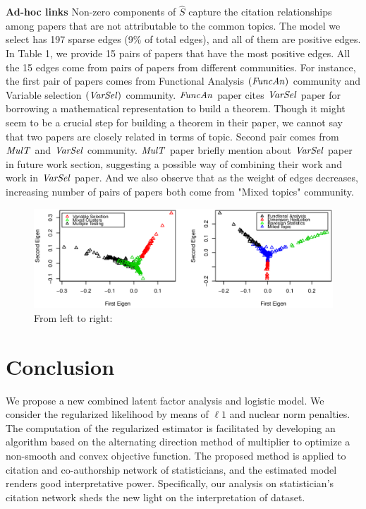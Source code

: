 \documentclass{article}
\begin{document}
\noindent\textbf{Ad-hoc links} Non-zero components of $\hat{S}$ capture the citation relationships among papers that are not attributable to the common topics. The model we select has 197 sparse edges (9\% of total edges), and all of them are positive edges. In Table 1, we provide 15 pairs of papers that have the most positive edges. All the 15 edges come from pairs of papers from different communities. For instance, the first pair of papers comes from Functional Analysis $(\it FuncAn)$ community and Variable selection $(\it VarSel)$ community. $\it FuncAn$ paper cites $\it VarSel$ paper for borrowing a mathematical representation to build a theorem. Though it might seem to be a crucial step for building a theorem in their paper, we cannot say that two papers are closely related in terms of topic. Second pair comes from $\it MulT$  and $\it VarSel$ community. $\it MulT$ paper briefly mention about $\it VarSel$ paper in future work section, suggesting a possible way of combining their work and work in $\it VarSel$ paper.  And we also observe that as the weight of edges decreases, increasing number of pairs of papers both come from "Mixed topics" community. \\

\begin{figure}[!t]
\includegraphics[width=1\textwidth]{Fig3.eps}
\caption{ From left to right: }
\label{fig:figure1}
\end{figure}


\section{Conclusion} 
We propose a new combined latent factor analysis and logistic model. We consider the regularized likelihood by means of $\ell 1$ and nuclear norm penalties. The computation of the regularized estimator is facilitated by developing an algorithm based on the alternating direction method of multiplier to optimize a non-smooth and convex objective function. The proposed method is applied to citation and co-authorship network of statisticians, and the estimated model renders good interpretative power. Specifically, our analysis on statistician's citation network sheds the new light on the interpretation of dataset.
\end{document}
